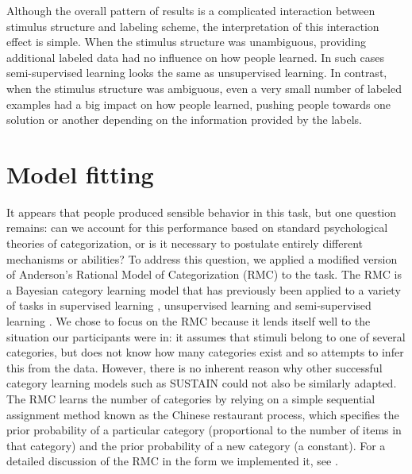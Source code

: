 \documentclass[a4paper, doc]{apa6}
\begin{document}
Although the overall pattern of results is a complicated interaction between stimulus structure and labeling scheme, the interpretation of this interaction effect is simple. When the stimulus structure was unambiguous, providing additional labeled data had no influence on how people learned. In such cases semi-supervised learning looks the same as unsupervised learning. In contrast, when the stimulus structure was ambiguous, even a very small number of labeled examples had a big impact on how people learned, pushing people towards one solution or another depending on the information provided by the labels.


\section{Model fitting}

It appears that people produced sensible behavior in this task, but one question remains: can we account for this performance based on standard psychological theories of categorization, or is it necessary to postulate entirely different mechanisms or abilities? To address this question, we applied a modified version of Anderson's \citeyear{anderson1991adaptive} Rational Model of Categorization (RMC) to the task. The RMC is a Bayesian category learning model that has previously been applied to a variety of tasks in supervised learning \cite{anderson1991adaptive}, unsupervised learning \cite{clapper2002adaptive, pothos2011measuring} and semi-supervised learning \cite{zhu2010cognitive}. We chose to focus on the RMC because it lends itself well to the situation our participants were in: it assumes that stimuli belong to one of several categories, but does not know how many categories exist and so attempts to infer this from the data. However, there is no inherent reason why other successful category learning models such as SUSTAIN \cite{love2004sustain} could not also be similarly adapted. The RMC learns the number of categories by relying on a simple sequential assignment method known as the Chinese restaurant process, which specifies the prior probability of a particular category (proportional to the number of items in that category) and the prior probability of a new category (a constant). For a detailed discussion of the RMC in the form we implemented it, see .
\end{document}
